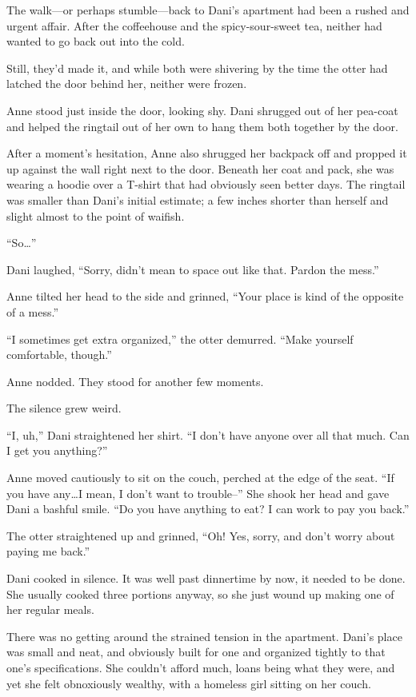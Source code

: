 \noindent The walk---or perhaps stumble---back to Dani's apartment had been a rushed and urgent affair. After the coffeehouse and the spicy-sour-sweet tea, neither had wanted to go back out into the cold.

Still, they'd made it, and while both were shivering by the time the otter had latched the door behind her, neither were frozen.

Anne stood just inside the door, looking shy. Dani shrugged out of her pea-coat and helped the ringtail out of her own to hang them both together by the door.

After a moment's hesitation, Anne also shrugged her backpack off and propped it up against the wall right next to the door. Beneath her coat and pack, she was wearing a hoodie over a T-shirt that had obviously seen better days. The ringtail was smaller than Dani's initial estimate; a few inches shorter than herself and slight almost to the point of waifish.

``So\ldots{}''

Dani laughed, ``Sorry, didn't mean to space out like that. Pardon the mess.''

Anne tilted her head to the side and grinned, ``Your place is kind of the opposite of a mess.''

``I sometimes get extra organized,'' the otter demurred. ``Make yourself comfortable, though.''

Anne nodded. They stood for another few moments.

The silence grew weird.

``I, uh,'' Dani straightened her shirt. ``I don't have anyone over all that much. Can I get you anything?''

Anne moved cautiously to sit on the couch, perched at the edge of the seat. ``If you have any\ldots{}I mean, I don't want to trouble--'' She shook her head and gave Dani a bashful smile. ``Do you have anything to eat? I can work to pay you back.''

The otter straightened up and grinned, ``Oh! Yes, sorry, and don't worry about paying me back.''

Dani cooked in silence. It was well past dinnertime by now, it needed to be done. She usually cooked three portions anyway, so she just wound up making one of her regular meals.

There was no getting around the strained tension in the apartment. Dani's place was small and neat, and obviously built for one and organized tightly to that one's specifications. She couldn't afford much, loans being what they were, and yet she felt obnoxiously wealthy, with a homeless girl sitting on her couch.

